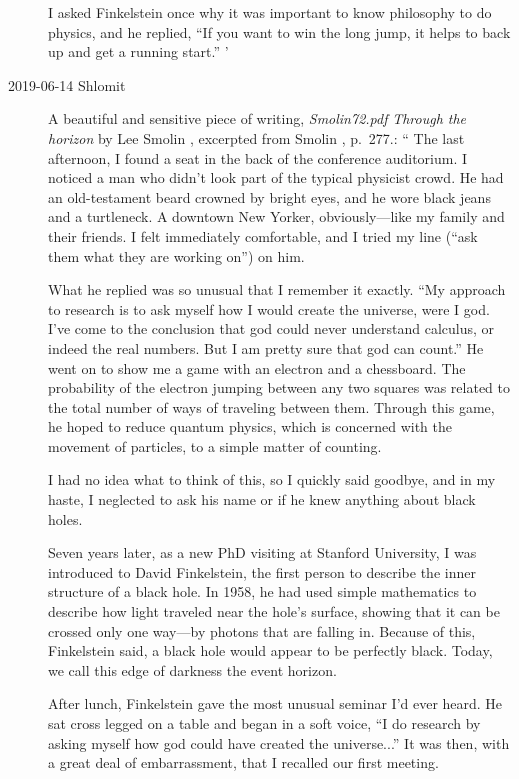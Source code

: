\begin{description}
I asked Finkelstein once why it was important to know philosophy to do
physics, and he replied, ``If you want to win the long jump, it helps to
back up and get a running start.''
'

\item[2019-06-14 Shlomit]
A beautiful and sensitive piece of writing, \emph{Smolin72.pdf}
\emph{Through the horizon} by Lee Smolin ,
excerpted from Smolin
, p.~277.:
``
The last afternoon, I found a seat in the back of the conference
auditorium. I noticed a man who didn't look part of the typical physicist
crowd. He had an old-testament beard crowned by bright eyes, and he wore
black jeans and a turtleneck. A downtown New Yorker, obviously—like my
family and their friends. I felt immediately comfortable, and I tried my
line (``ask them what they are working on'') on him.

What he replied was so unusual that I remember it exactly. ``My approach
to research is to ask myself how I would create the universe, were I god.
I've come to the conclusion that god could never understand calculus, or
indeed the real numbers. But I am pretty sure that god can count.'' He
went on to show me a game with an electron and a chessboard. The
probability of the electron jumping between any two squares was related
to the total number of ways of traveling between them. Through this game,
he hoped to reduce quantum physics, which is concerned with the movement
of particles, to a simple matter of counting.

I had no idea what to think of this, so I quickly said goodbye, and in my
haste, I neglected to ask his name or if he knew anything about black
holes.

Seven years later, as a new PhD visiting at Stanford University, I was
introduced to David Finkelstein, the first person to describe the inner
structure of a black hole. In 1958, he had used simple mathematics to
describe how light traveled near the hole's surface, showing that it can
be crossed only one way—by photons that are falling in.
Because of this, Finkelstein said, a black hole would appear to be
perfectly black. Today, we call this edge of darkness the event horizon.

After lunch, Finkelstein gave the most unusual seminar I'd ever heard. He
sat cross legged on a table and began in a soft voice, ``I do research by
asking myself how god could have created the universe...'' It was then,
with a great deal of embarrassment, that I recalled our first meeting.


\end{description}
